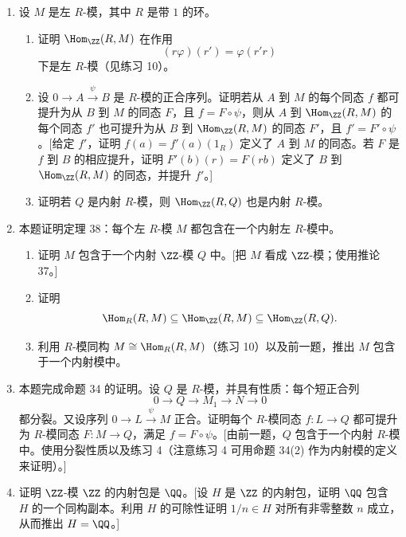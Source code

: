 \begin{enumerate}[label=\arabic*.]
\begin{enumerate}[label=(\alph*)]
\[		\]
		都是阿贝尔群短正合列，当且仅当原序列是分裂短正合列。[为了证明序列分裂，取 $D=N$，并证明 $\Hom_R(N,N)$ 中恒等映射到 $\Hom_R(N,M)$ 的提升给出 $\varphi$ 的一个分裂同态。]
		\item 证明对所有 $R$-模 $D$，相伴序列
		\[
		0\longrightarrow\Hom_R(N,D)\xrightarrow{\varphi'}\Hom_R(M,D)
		\xrightarrow{\psi'}\Hom_R(L,D)\longrightarrow0
		\]
		都是阿贝尔群短正合列，当且仅当原序列是分裂短正合列。
	\end{enumerate}
	\item 设 $M$ 是左 $R$-模，其中 $R$ 是带 $1$ 的环。
	\begin{enumerate}[label=(\alph*)]
		\item 证明 $\Hom_{\ZZ}(R,M)$ 在作用
		\[
		(r\varphi)(r')=\varphi(r'r)
		\]
		下是左 $R$-模（见练习 10）。
		\item 设 $0\to A\xrightarrow{\psi}B$ 是 $R$-模的正合序列。证明若从 $A$ 到 $M$ 的每个同态 $f$ 都可提升为从 $B$ 到 $M$ 的同态 $F$，且 $f=F\circ\psi$，则从 $A$ 到 $\Hom_{\ZZ}(R,M)$ 的每个同态 $f'$ 也可提升为从 $B$ 到 $\Hom_{\ZZ}(R,M)$ 的同态 $F'$，且 $f'=F'\circ\psi$。[给定 $f'$，证明 $f(a)=f'(a)(1_R)$ 定义了 $A$ 到 $M$ 的同态。若 $F$ 是 $f$ 到 $B$ 的相应提升，证明 $F'(b)(r)=F(rb)$ 定义了 $B$ 到 $\Hom_{\ZZ}(R,M)$ 的同态，并提升 $f'$。]
		\item 证明若 $Q$ 是内射 $R$-模，则 $\Hom_{\ZZ}(R,Q)$ 也是内射 $R$-模。
	\end{enumerate}
	\item 本题证明定理 38：每个左 $R$-模 $M$ 都包含在一个内射左 $R$-模中。
	\begin{enumerate}[label=(\alph*)]
		\item 证明 $M$ 包含于一个内射 $\ZZ$-模 $Q$ 中。[把 $M$ 看成 $\ZZ$-模；使用推论 37。]
		\item 证明
		\[
		\Hom_R(R,M)\subseteq\Hom_{\ZZ}(R,M)\subseteq\Hom_{\ZZ}(R,Q).
		\]
		\item 利用 $R$-模同构 $M\cong\Hom_R(R,M)$（练习 10）以及前一题，推出 $M$ 包含于一个内射模中。
	\end{enumerate}
	\item 本题完成命题 34 的证明。设 $Q$ 是 $R$-模，并具有性质：每个短正合列
	\[
	0\longrightarrow Q\longrightarrow M_1\longrightarrow N\longrightarrow0
	\]
	都分裂。又设序列 $0\to L\xrightarrow{\psi}M$ 正合。证明每个 $R$-模同态 $f:L\to Q$ 都可提升为 $R$-模同态 $F:M\to Q$，满足 $f=F\circ\psi$。[由前一题，$Q$ 包含于一个内射 $R$-模中。使用分裂性质以及练习 4（注意练习 4 可用命题 34(2) 作为内射模的定义来证明）。]
	\item 证明 $\ZZ$-模 $\ZZ$ 的内射包是 $\QQ$。[设 $H$ 是 $\ZZ$ 的内射包，证明 $\QQ$ 包含 $H$ 的一个同构副本。利用 $H$ 的可除性证明 $1/n\in H$ 对所有非零整数 $n$ 成立，从而推出 $H=\QQ$。]

\end{enumerate}
